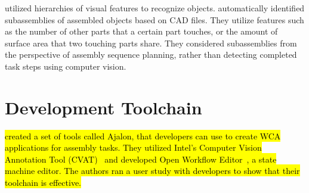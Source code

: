\citet{semantic_hierarchy} utilized hierarchies of visual features to recognize
objects.
\citet{subassembly_identification} automatically identified subassemblies of
assembled objects based on CAD files.
They utilize features such as the number of other parts that a certain part
touches, or the amount of surface area that two touching parts share.
They considered subassemblies from the perspective of assembly sequence
planning, rather than detecting completed task steps using computer vision.

\section{Development Toolchain}

\citet{pham2021ajalon}
\hl{
  created a set of tools called Ajalon, that developers can use to create WCA
  applications for assembly tasks.
  They utilized Intel's Computer Vision Annotation Tool (CVAT)~{\cite{CVAT}} and
  developed Open Workflow Editor~{\cite{workflow}}, a state machine editor.
  The authors ran a user study with developers to show that their toolchain is
  effective.
}
